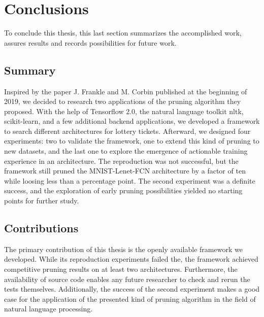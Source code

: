\chapter{Conclusions}
\label{ch:closure}

To conclude this thesis, this last section summarizes the accomplished work, assures results and records possibilities for future work.

\section{Summary}
Inspired by the paper J. Frankle and M. Corbin published at the beginning of 2019, we decided to research two applications of the pruning algorithm they proposed. With the help of Tensorflow 2.0, the natural language toolkit nltk, scikit-learn, and a few additional backend applications, we developed a framework to search different architectures for lottery tickets. Afterward, we designed four experiments: two to validate the framework, one to extend this kind of pruning to new datasets, and the last one to explore the emergence of actionable training experience in an architecture.  The reproduction was not successful, but the framework still pruned the MNIST-Lenet-FCN architecture by a factor of ten while loosing less than a percentage point. The second experiment was a definite success, and the exploration of early pruning possibilities yielded no starting points for further study.

\section{Contributions}
The primary contribution of this thesis is the openly available framework we developed. While its reproduction experiments failed the, the framework achieved competitive pruning results on at least two architectures. Furthermore, the availability of source code enables any future researcher to check and rerun the tests themselves. Additionally, the success of the second experiment makes a good case for the application of the presented kind of pruning algorithm in the field of natural language processing.

